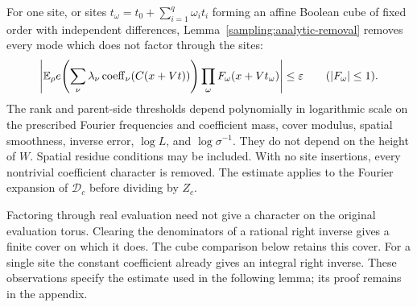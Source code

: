 For one site, or sites
$t_\omega=t_0+\sum_{i=1}^q\omega_it_i$ forming an affine Boolean
cube of fixed order with independent differences, Lemma~\ref{sampling:analytic-removal}
removes every mode which does not factor through the sites:
\[
 \left|\mathbb E_\rho
 e\!\left(\sum_\nu\lambda_\nu
          \operatorname{coeff}_\nu(C(x+Vt))\right)
       \prod_\omega F_\omega(x+Vt_\omega)\right|
 \le\varepsilon
 \qquad(|F_\omega|\le1).
\]
The rank and parent-side thresholds depend polynomially in
logarithmic scale on the prescribed Fourier frequencies and
coefficient mass, cover modulus, spatial smoothness, inverse
error, $\log L$, and $\log\sigma^{-1}$. They do not depend on the
height of $W$. Spatial residue conditions may be included.
With no site insertions, every nontrivial coefficient character
is removed. The estimate applies to the Fourier expansion of
$\mathcal D_c$ before dividing by $Z_c$.

Factoring through real evaluation need not give a character on
the original evaluation torus. Clearing the denominators of a
rational right inverse gives a finite cover on which it does.
The cube comparison below retains this cover. For a single site
the constant coefficient already gives an integral right inverse.
These observations specify the estimate used in the following
lemma; its proof remains in the appendix.

